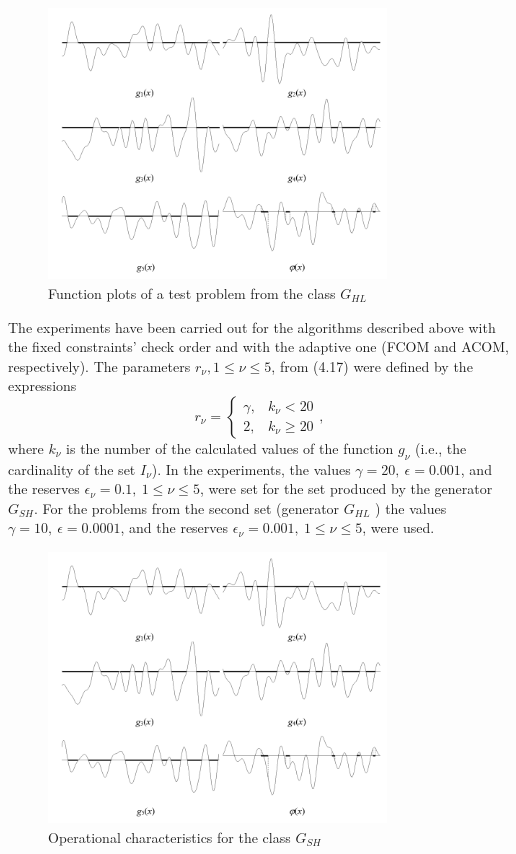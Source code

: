 \begin{figure}[ht]
  \centering
  \includegraphics[width=0.8\textwidth]{figures/4_13.png}
  \caption{Function plots of a test problem from the class $G_{HL}$}
  \label{fig:4_13}
\end{figure}

The experiments have been carried out for the algorithms described above with the fixed constraints’ check order and with the adaptive one (FCOM and ACOM, respectively). The parameters $r_\nu, 1\le\nu\le 5$, from (4.17) were defined by the expressions
\begin{displaymath}
  r_\nu = \left\{
  \begin{array}{lr}
    \gamma, & k_\nu < 20\\
    2, & k_\nu \ge 20
  \end{array}
  \right.,
\end{displaymath}
where $k_\nu$ is the number of the calculated values of the function $g_\nu$ (i.e., the cardinality of the set $I_\nu$). In the experiments, the values $\gamma=20,\: \epsilon = 0.001$, and the reserves $\epsilon_\nu=0.1,\: 1\le\nu\le 5$, were set for the set produced by the generator $G_{SH}$. For the problems from the second set (generator $G_{HL}$ ) the values  $\gamma=10,\: \epsilon = 0.0001$, and the reserves $\epsilon_\nu=0.001,\: 1\le\nu\le 5$, were used.

\begin{figure}[ht]
  \centering
  \includegraphics[width=0.8\textwidth]{figures/4_13.png}
  \caption{Operational characteristics for the class $G_{SH}$}
  \label{fig:4_14}
\end{figure}


